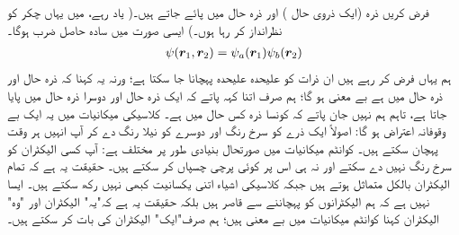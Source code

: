 فرض کریں ذرہ   (ایک ذروی حال )  اور ذرہ    حال  میں پائے جاتے ہیں۔( یاد رہے،   میں یہاں چکر کو نظرانداز کر رہا ہوں۔)  ایسی صورت میں  سادہ حاصل ضرب ہوگا۔
\begin{align}
	\psi({{\boldsymbol{r}}}_1, {{\boldsymbol{r}}}_2)=\psi_a({{\boldsymbol{r}}}_1)\psi_b({{\boldsymbol{r}}}_2)
\end{align}
 ہم یہاں  فرض کر رہے ہیں  ان ذرات کو علیحدہ علیحدہ پہچانا جا  سکتا ہے؛  ورنہ یہ کہنا کہ ذرہ  حال   اور ذرہ  حال  میں ہے بے معنی ہو  گا؛   ہم  صرف اتنا کہہ پاتے کہ ایک ذرہ  حال   اور دوسرا ذرہ  حال  میں پایا جاتا ہے، تاہم ہم نہیں جان پاتے کہ کونسا ذرہ کس حال میں ہے۔ کلاسیکی میکانیات میں یہ ایک بے وقوفانہ  اعتراض ہو گا: اصولاً ایک ذرے کو سرخ رنگ اور دوسرے کو نیلا رنگ دے کر آپ انہیں ہر وقت پہچان سکتے ہیں۔ کوانٹم میکانیات میں صورتحال بنیادی طور پر مختلف ہے:  آپ کسی الیکٹران کو سرخ رنگ نہیں دے سکتے  اور نہ ہی اس پر کوئی پرچی چسپاں کر سکتے ہیں۔ حقیقت یہ ہے کہ تمام الیکٹران بالکل متماثل ہوتے ہیں جبکہ کلاسیکی اشیاء اتنی یکسانیت کبھی نہیں رکھ سکتے ہیں۔ ایسا نہیں ہے کہ ہم الیکٹرانوں کو پہچاننے سے قاصر ہیں بلکہ حقیقت یہ ہے کہ"یہ" الیکٹران اور "وہ"   الیکٹران   کہنا کوانٹم میکانیات میں بے معنی ہیں؛   ہم صرف"ایک" الیکٹران کی بات کر سکتے ہیں۔
 

